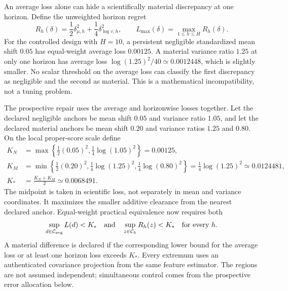 An average loss alone can hide a scientifically material discrepancy at one
horizon.  Define the unweighted horizon regret
\begin{equation}
  R_h(\delta)=\frac12\delta_{\mu,h}^2
                    +\frac14\delta_{\log v,h}^2,
  \qquad
  L_{\max}(\delta)=\max_{1\leq h\leq H}R_h(\delta).
  \label{eq:bf-ssl-lstm-horizon-loss}
\end{equation}
For the controlled design with $H=10$, a persistent negligible standardized
mean shift $0.05$ has equal-weight average loss $0.00125$.  A material variance
ratio $1.25$ at only one horizon has average loss
$\log(1.25)^2/40\simeq0.0012448$, which is slightly smaller.  No scalar
threshold on the average loss can classify the first discrepancy as
negligible and the second as material.  This is a mathematical incompatibility,
not a tuning problem.

The prospective repair uses the average and horizonwise losses together.  Let
the declared negligible anchors be mean shift $0.05$ and variance ratio
$1.05$, and let the declared material anchors be mean shift $0.20$ and
variance ratios $1.25$ and $0.80$.  On the local proper-score scale define
\begin{align}
  K_N&=\max\left\{\tfrac12(0.05)^2,
                    \tfrac14\log(1.05)^2\right\}=0.00125,\\
  K_M&=\min\left\{\tfrac12(0.20)^2,
                    \tfrac14\log(1.25)^2,
                    \tfrac14\log(0.80)^2\right\}
       =\tfrac14\log(1.25)^2\simeq0.0124481,\\
  K_*&=\frac{K_N+K_M}{2}\simeq0.0068491.
  \label{eq:bf-ssl-lstm-dual-loss-threshold}
\end{align}
The midpoint is taken in scientific loss, not separately in mean and variance
coordinates.  It maximizes the smaller additive clearance from the nearest
declared anchor.  Equal-weight practical equivalence now requires both
\begin{equation}
  \sup_{d\in\mathcal C_{\rm avg}}L(d)<K_*
  \quad\text{and}\quad
  \sup_{z\in\mathcal C_h}R_h(z)<K_*
  \quad\text{for every }h.
  \label{eq:bf-ssl-lstm-dual-equivalence}
\end{equation}
A material difference is declared if the corresponding lower bound for the
average loss or at least one horizon loss exceeds $K_*$.  Every extremum uses
an authenticated covariance projection from the same feature estimator.  The
regions are not assumed independent; simultaneous control comes from the
prospective error allocation below.

